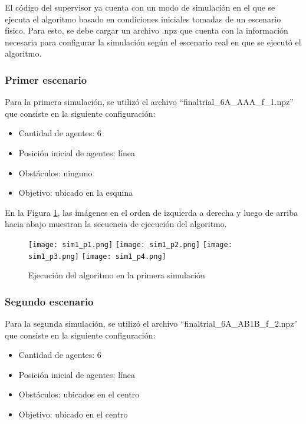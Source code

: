 El código del supervisor ya cuenta con un modo de simulación en el que se ejecuta el algoritmo basado en condiciones iniciales tomadas de un escenario físico. Para esto, se debe cargar un archivo .npz que cuenta con la información necesaria para configurar la simulación según el escenario real en que se ejecutó el algoritmo.

\subsubsection{Primer escenario}
Para la primera simulación, se utilizó el archivo ``finaltrial\_6A\_AAA\_f\_1.npz'' que consiste en la siguiente configuración:
\begin{itemize}
	\item Cantidad de agentes: 6
	\item Posición inicial de agentes: línea
	\item Obstáculos: ninguno
	\item Objetivo: ubicado en la esquina
\end{itemize}

En la Figura \ref{fig:primera_simulacion}, las imágenes en el orden de izquierda a derecha y luego de arriba hacia abajo muestran la secuencia de ejecución del algoritmo.

\begin{figure}[H]
	\centering
	\texttt{[image: sim1\_p1.png]}
	\texttt{[image: sim1\_p2.png]}
	\texttt{[image: sim1\_p3.png]}
	\texttt{[image: sim1\_p4.png]}
	\caption{Ejecución del algoritmo en la primera simulación}
	\label{fig:primera_simulacion}
\end{figure}

\subsubsection{Segundo escenario}
Para la segunda simulación, se utilizó el archivo ``finaltrial\_6A\_AB1B\_f\_2.npz'' que consiste en la siguiente configuración:
\begin{itemize}
	\item Cantidad de agentes: 6
	\item Posición inicial de agentes: línea
	\item Obstáculos: ubicados en el centro
	\item Objetivo: ubicado en el centro
\end{itemize}

